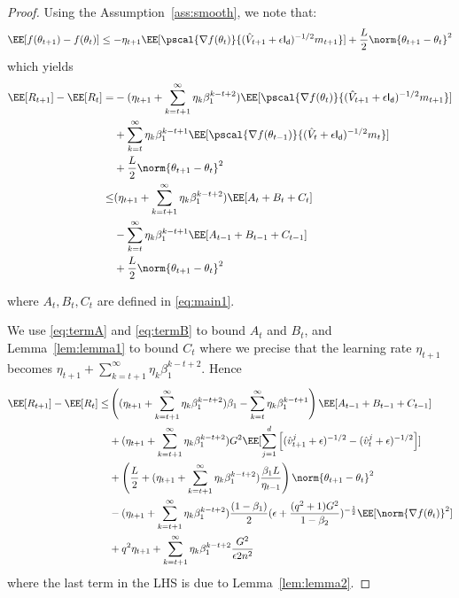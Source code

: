 \documentclass[11pt]{article}
\begin{document}
\begin{proof}
Using the Assumption~\ref{ass:smooth}, we note that:
\begin{equation}
\begin{split}
\EE[f(\theta_{t+1}) - f(\theta_{t}) ] \leq - \eta_{t+1} \EE[\pscal{\nabla f(\theta_{t})}{(\hat{V}_{t+1} + \epsilon \mathsf{I_d})^{-1/2} m_{t+1}}] +\frac{L}{2}  \norm{\theta_{t+1} - \theta_{t}}^2
\end{split}
\end{equation}
which yields
\begin{equation}
\begin{split}
\EE[R_{t+1}] - \EE[R_t] =& - (\eta_{t+1} + \sum_{k=t+1}^\infty \eta_{k} \beta_1^{k-t+2})\EE[\pscal{\nabla f(\theta_{t})}{(\hat{V}_{t+1} + \epsilon \mathsf{I_d})^{-1/2} m_{t+1}}] \\
& +  \sum_{k=t}^\infty \eta_{k} \beta_1^{k-t+1}\EE[\pscal{\nabla f(\theta_{t-1})}{(\hat{V}_{t} + \epsilon \mathsf{I_d})^{-1/2} m_{t}}]\\
& +\frac{L}{2}  \norm{\theta_{t+1} - \theta_{t}}^2\\
\leq&  (\eta_{t+1} + \sum_{k=t+1}^\infty \eta_{k} \beta_1^{k-t+2})\EE[A_t + B_t + C_t] \\
& -  \sum_{k=t}^\infty \eta_{k} \beta_1^{k-t+1}\EE[A_{t-1} + B_{t-1} + C_{t-1}]\\
& +\frac{L}{2}  \norm{\theta_{t+1} - \theta_{t}}^2
\end{split}
\end{equation}

where $A_t, B_t, C_t$ are defined in \eqref{eq:main1}.

We use \eqref{eq:termA} and \eqref{eq:termB} to bound $A_t$ and $B_t$, and Lemma~\ref{lem:lemma1} to bound $C_t$ where we precise that the learning rate $\eta_{t+1}$ becomes $ \eta_{t+1}+ \sum_{k=t+1}^\infty \eta_{k} \beta_1^{k-t+2}$.
Hence
\begin{equation}\label{eq:mainR}
\begin{split}
\EE[R_{t+1}] - \EE[R_t] \leq &
  \left( (\eta_{t+1} + \sum_{k=t+1}^\infty \eta_{k} \beta_1^{k-t+2}) \beta_1- \sum_{k=t}^\infty \eta_{k} \beta_1^{k-t+1}\right) \EE[A_{t-1} + B_{t-1} + C_{t-1}]\\
&  +  (\eta_{t+1}+ \sum_{k=t+1}^\infty \eta_{k} \beta_1^{k-t+2}) G^2 \EE[\sum_{j=1}^d \left[(\hat{v}^j_{t+1} + \epsilon )^{-1/2} - (\hat{v}^j_{t} + \epsilon )^{-1/2}  \right] ]\\
& + \left(\frac{L}{2} + (\eta_{t+1}+ \sum_{k=t+1}^\infty \eta_{k} \beta_1^{k-t+2})\frac{\beta_1 L}{\eta_{t-1}} \right)   \norm{\theta_{t+1} - \theta_{t}}^2\\
& - (\eta_{t+1}+ \sum_{k=t+1}^\infty \eta_{k} \beta_1^{k-t+2})\frac{(1-\beta_1)}{2}  (\epsilon + \frac{(q^2+1)G^2}{1 - \beta_2})^{-\frac{1}{2}} \EE[\norm{\nabla f(\theta_t)}^2] \\
& +q^2 \eta_{t+1}+ \sum_{k=t+1}^\infty \eta_{k} \beta_1^{k-t+2}\frac{G^2 }{\epsilon 2n^2}
\end{split}
\end{equation}
where the last term in the LHS is due to Lemma~\ref{lem:lemma2}.


\end{proof}
\end{document}
